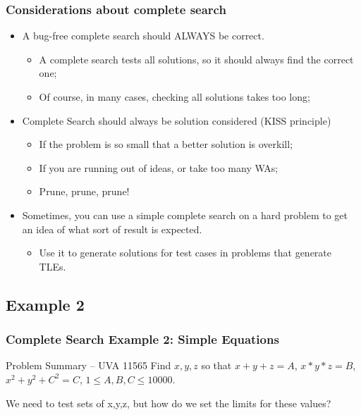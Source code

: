 \documentclass{beamer}
\begin{document}
\begin{frame}
  \frametitle{Considerations about complete search}
  \begin{itemize}
  \item A bug-free complete search should ALWAYS be correct.\\
    \begin{itemize}
    \item A complete search tests all solutions, so it should always
      find the correct one;
    \item Of course, in many cases, checking all solutions takes too long;
    \end{itemize}

    \bigskip

  \item Complete Search should always be solution considered (KISS
    principle)
    \begin{itemize}
    \item If the problem is so small that a better solution is overkill;
    \item If you are running out of ideas, or take too many WAs;
    \item Prune, prune, prune!
    \end{itemize}
    
    \bigskip

  \item Sometimes, you can use a simple complete search on a hard
    problem to get an idea of what sort of result is expected.
    \begin{itemize}
    \item Use it to generate solutions for test cases in problems that
      generate TLEs.
    \end{itemize}
  \end{itemize}
\end{frame}

\subsection{Example 2}

\begin{frame}
  \frametitle{Complete Search Example 2: Simple Equations}
  \begin{block}{Problem Summary -- UVA 11565}
    Find $x,y,z$ so that $x+y+z=A$, $x*y*z=B$, $x^2+y^2+C^2=C$, $1
    \leq A,B,C \leq 10000$.

    \bigskip
  \end{block}

  \vfill

  We need to test sets of x,y,z, but how do we set the limits for
  these values?
\end{frame}
\end{document}
